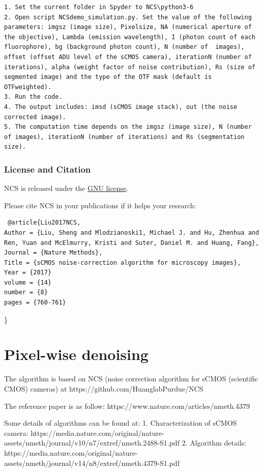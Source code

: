 \documentclass[11pt]{article}
\begin{document}
\begin{verbatim}
1. Set the current folder in Spyder to NCS\python3-6
2. Open script NCSdemo_simulation.py. Set the value of the following parameters: imgsz (image size), Pixelsize, NA (numerical aperture of the objective), Lambda (emission wavelength), I (photon count of each fluorophore), bg (background photon count), N (number of  images), offset (offset ADU level of the sCMOS camera), iterationN (number of iterations), alpha (weight factor of noise contribution), Rs (size of segmented image) and the type of the OTF mask (default is OTFweighted).
3. Run the code.
4. The output includes: imsd (sCMOS image stack), out (the noise corrected image).
5. The computation time depends on the imgsz (image size), N (number of images), iterationN (number of iterations) and Rs (segmentation size).
\end{verbatim}

\subsubsection{License and Citation}\label{license-and-citation}

NCS is released under the
\href{https://github.com/HuanglabPurdue/NCS/edit/master/LICENSE}{GNU
license}.

Please cite NCS in your publications if it helps your research:

\begin{verbatim}
 @article{Liu2017NCS,
Author = {Liu, Sheng and Mlodzianoski1, Michael J. and Hu, Zhenhua and Ren, Yuan and McElmurry, Kristi and Suter, Daniel M. and Huang, Fang},
Journal = {Nature Methods},
Title = {sCMOS noise-correction algorithm for microscopy images},
Year = {2017}
volume = {14}
number = {8}
pages = {760-761}
\end{verbatim}

\}

    \section{Pixel-wise denoising}\label{pixel-wise-denoising}

The algorithm is based on NCS (noise correction algorithm for sCMOS
(scientific CMOS) cameras) at https://github.com/HuanglabPurdue/NCS

The reference paper is as follow:
https://www.nature.com/articles/nmeth.4379

Some details of algorithms can be found at: 1. Characterization of sCMOS
camera:
https://media.nature.com/original/nature-assets/nmeth/journal/v10/n7/extref/nmeth.2488-S1.pdf
2. Algorithm details:
https://media.nature.com/original/nature-assets/nmeth/journal/v14/n8/extref/nmeth.4379-S1.pdf
\end{document}
